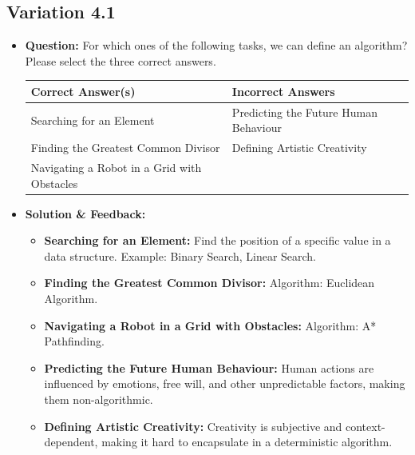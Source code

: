 \subsection{Variation 4.1}
\begin{itemize}
    \item \textbf{Question:} For which ones of the following tasks, we can define an algorithm? Please select the three correct answers.
    
    \begin{tabular}{|l|l|}
        \hline
        \textbf{Correct Answer(s)} & \textbf{Incorrect Answers} \\
        \hline
        Searching for an Element & Predicting the Future Human Behaviour \\
        Finding the Greatest Common Divisor & Defining Artistic Creativity \\
        Navigating a Robot in a Grid with Obstacles & \\
        \hline
    \end{tabular}
    
    \item \textbf{Solution \& Feedback:}
    \begin{itemize}
        \item \textbf{Searching for an Element:} Find the position of a specific value in a data structure. Example: Binary Search, Linear Search.
        \item \textbf{Finding the Greatest Common Divisor:} Algorithm: Euclidean Algorithm.
        \item \textbf{Navigating a Robot in a Grid with Obstacles:} Algorithm: A* Pathfinding.
        \item \textbf{Predicting the Future Human Behaviour:} Human actions are influenced by emotions, free will, and other unpredictable factors, making them non-algorithmic.
        \item \textbf{Defining Artistic Creativity:} Creativity is subjective and context-dependent, making it hard to encapsulate in a deterministic algorithm.
    \end{itemize}
\end{itemize}

